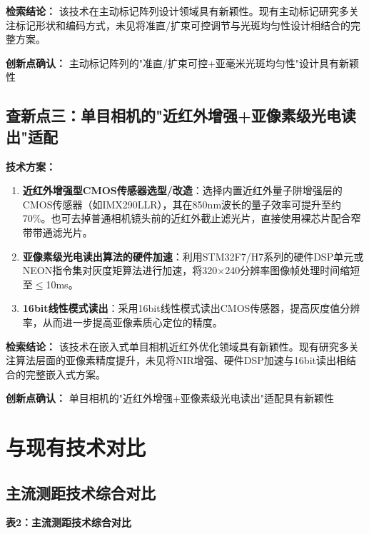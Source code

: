\documentclass[12pt, a4paper]{ctexart}
\begin{document}
\textbf{检索结论：} 该技术在主动标记阵列设计领域具有新颖性。现有主动标记研究多关注标记形状和编码方式，未见将准直/扩束可控调节与光斑均匀性设计相结合的完整方案。

\textbf{创新点确认：} 主动标记阵列的"准直/扩束可控+亚毫米光斑均匀性"设计具有新颖性

\subsection{查新点三：单目相机的"近红外增强+亚像素级光电读出"适配}

\textbf{技术方案：}

\begin{enumerate}
\item \textbf{近红外增强型CMOS传感器选型/改造}：选择内置近红外量子阱增强层的CMOS传感器（如IMX290LLR），其在850nm波长的量子效率可提升至约70\%。也可去掉普通相机镜头前的近红外截止滤光片，直接使用裸芯片配合窄带带通滤光片。

\item \textbf{亚像素级光电读出算法的硬件加速}：利用STM32F7/H7系列的硬件DSP单元或NEON指令集对灰度矩算法进行加速，将320$\times$240分辨率图像帧处理时间缩短至$\le$10ms。

\item \textbf{16bit线性模式读出}：采用16bit线性模式读出CMOS传感器，提高灰度值分辨率，从而进一步提高亚像素质心定位的精度。
\end{enumerate}

\textbf{检索结论：} 该技术在嵌入式单目相机近红外优化领域具有新颖性。现有研究多关注算法层面的亚像素精度提升，未见将NIR增强、硬件DSP加速与16bit读出相结合的完整嵌入式方案。

\textbf{创新点确认：} 单目相机的"近红外增强+亚像素级光电读出"适配具有新颖性

\section{与现有技术对比}

\subsection{主流测距技术综合对比}

\textbf{表2：主流测距技术综合对比}
\end{document}
